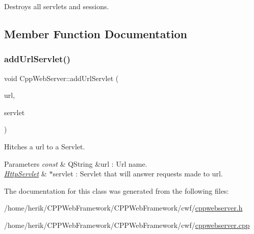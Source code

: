 Destroys all servlets and sessions. 



\subsection{Member Function Documentation}
\mbox{\label{class_cpp_web_server_ae94dcf116776b97ec7d5a00cde87c6bd}} 
\subsubsection{\texorpdfstring{add\+Url\+Servlet()}{addUrlServlet()}}
{\footnotesize\ttfamily void Cpp\+Web\+Server\+::add\+Url\+Servlet (\begin{DoxyParamCaption}\item[{const Q\+String \&}]{url,  }\item[{\hyperlink{class_http_servlet}{Http\+Servlet} $\ast$}]{servlet }\end{DoxyParamCaption})}



Hitches a url to a Servlet. 


\begin{DoxyParams}{Parameters}
{\em const} & Q\+String \&url \+: Url name. \\
\hline
{\em \hyperlink{class_http_servlet}{Http\+Servlet}} & $\ast$servlet \+: Servlet that will answer requests made to url. \\
\hline
\end{DoxyParams}


The documentation for this class was generated from the following files\+:\begin{DoxyCompactItemize}
\item 
/home/herik/\+C\+P\+P\+Web\+Framework/\+C\+P\+P\+Web\+Framework/cwf/\hyperlink{cppwebserver_8h}{cppwebserver.\+h}\item 
/home/herik/\+C\+P\+P\+Web\+Framework/\+C\+P\+P\+Web\+Framework/cwf/\hyperlink{cppwebserver_8cpp}{cppwebserver.\+cpp}\end{DoxyCompactItemize}
